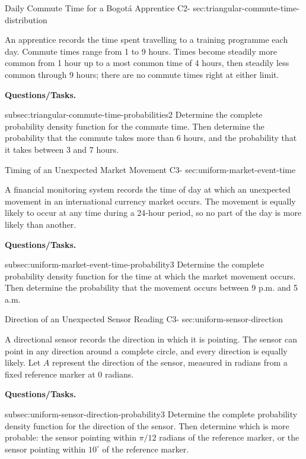 	\sectionScored
	{Daily Commute Time for a Bogotá Apprentice}
	{C2-}
	{sec:triangular-commute-time-distribution}
	{
		An apprentice records the time spent travelling to a training programme
		each day. Commute times range from 1 to 9 hours. Times become steadily
		more common from 1 hour up to a most common time of 4 hours, then
		steadily less common through 9 hours; there are no commute times right
		at either limit.
		
		\textbf{Questions/Tasks.}
		\begin{enumerate}
			\CriterionTask
			{subsec:triangular-commute-time-probabilities}{2}
			{Determine the complete probability density function for the commute
				time. Then determine the probability that the commute takes more
				than 6 hours, and the probability that it takes between 3 and 7
				hours. }
		\end{enumerate}
		
	}
	
	
	\sectionScored
	{Timing of an Unexpected Market Movement}
	{C3-\sml{4}}
	{sec:uniform-market-event-time}
	{
		A financial monitoring system records the time of day at which an unexpected movement in an international currency market occurs. The movement is equally likely to occur at any time during a 24-hour period, so no part of the day is more likely than another.
		
		\textbf{Questions/Tasks.}
		\begin{enumerate}
			\CriterionTask
			{subsec:uniform-market-event-time-probability}{3}
			{Determine the complete probability density function for the time at which the market movement occurs. Then determine the probability that the movement occurs between 9 p.m. and 5 a.m. \score{4}}
		\end{enumerate}
		
	}

	\sectionScored
	{Direction of an Unexpected Sensor Reading}
	{C3-}
	{sec:uniform-sensor-direction}
	{
		A directional sensor records the direction in which it is pointing.
		The sensor can point in any direction around a complete circle, and
		every direction is equally likely. Let \(A\) represent the direction
		of the sensor, measured in radians from a fixed reference marker at
		\(0\) radians.
		
		\textbf{Questions/Tasks.}
		\begin{enumerate}
			\CriterionTask
			{subsec:uniform-sensor-direction-probability}{3}
			{Determine the complete probability density function for the
				direction of the sensor. Then determine which is more probable:
				the sensor pointing within \(\pi/12\) radians of the reference
				marker, or the sensor pointing within \(10^\circ\) of the reference
				marker. }
		\end{enumerate}
		
	}
	
